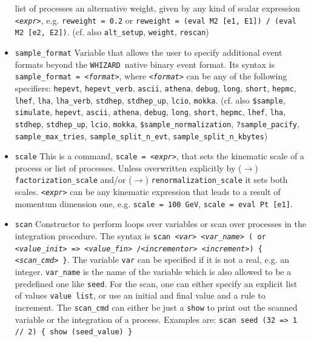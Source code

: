 \documentclass[12pt]{book}
\newcommand{\ttt}[1]{\texttt{#1}}
\newcommand{\whizard}{\ttt{WHIZARD}}
\begin{document}
\begin{itemize}
list of processes an alternative weight, given by any kind of scalar
expression \ttt{{\em <expr>}}, e.g. \ttt{reweight = 0.2} or \ttt{reweight =
(eval M2 [e1, E1]) / (eval M2 [e2, E2])}. (cf. also \ttt{alt\_setup},
\ttt{weight}, \ttt{rescan})
\item
\ttt{sample\_format} \newline
Variable that allows the user to specify additional event formats
beyond the \whizard\ native binary event format. Its syntax is
\ttt{sample\_format = {\em <format>}}, where \ttt{{\em <format>}} can be any of
the following specifiers: \ttt{hepevt}, \ttt{hepevt\_verb}, \ttt{ascii},
\ttt{athena}, \ttt{debug}, \ttt{long}, \ttt{short}, \ttt{hepmc},
\ttt{lhef}, \ttt{lha}, \ttt{lha\_verb}, \ttt{stdhep}, \ttt{stdhep\_up},
\texttt{lcio}, \texttt{mokka}.
(cf. also \ttt{\$sample}, \ttt{simulate}, \ttt{hepevt}, \ttt{ascii},
\ttt{athena}, \ttt{debug}, \ttt{long}, \ttt{short}, \ttt{hepmc},
\ttt{lhef}, \ttt{lha}, \ttt{stdhep}, \ttt{stdhep\_up}, \texttt{lcio},
\texttt{mokka}, \ttt{\$sample\_normalization}, \ttt{?sample\_pacify}, \newline
\ttt{sample\_max\_tries}, \ttt{sample\_split\_n\_evt}, \ttt{sample\_split\_n\_kbytes})
\item
\ttt{scale} \newline
This is a command, \ttt{scale = {\em <expr>}}, that sets the kinematic scale
of a process or list of processes. Unless overwritten explicitly by
($\to$) \ttt{factorization\_scale} and/or ($\to$)
\ttt{renormalization\_scale} it sets both scales. \ttt{{\em <expr>}} can be
any kinematic expression that leads to a result of momentum dimension
one, e.g. \ttt{scale = 100 GeV}, \ttt{scale = eval Pt [e1]}.
\item
\ttt{scan} \newline
Constructor to perform loops over variables or scan over processes in
the integration procedure. The syntax is \ttt{scan {\em <var>} {\em <var\_name>}
  ({\em <value list>} or  {\em <value\_init>} => {\em <value\_fin>} /{\em <incrementor>}
  {\em <increment>}) \{ {\em <scan\_cmd>} \}}. The variable \ttt{var} can be
specified if it is not a real, e.g. an integer. \ttt{var\_name} is the
name of the variable which is also allowed to be a predefined one like
\ttt{seed}. For the scan, one can either specify an explicit list of
values \ttt{value list}, or use an initial and final value and a
rule to increment. The \ttt{scan\_cmd}  can either be just a
\ttt{show} to print out the scanned variable or the integration of a process.
Examples are: \ttt{scan seed (32 => 1 // 2) \{ show (seed\_value) \}
}
\end{itemize}
\end{document}
